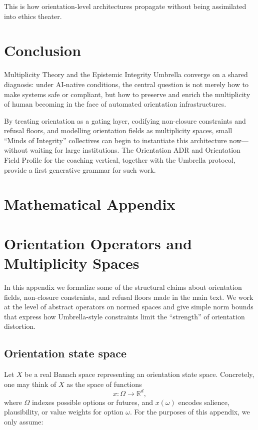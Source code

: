 \documentclass[11pt]{article}
\begin{document}
This is how orientation-level architectures propagate without being assimilated into ethics theater.

\section*{Conclusion}

Multiplicity Theory and the Epistemic Integrity Umbrella converge on a shared diagnosis: under AI-native conditions, the central question is not merely how to make systems safe or compliant, but how to preserve and enrich the multiplicity of human becoming in the face of automated orientation infrastructures.

By treating orientation as a gating layer, codifying non-closure constraints and refusal floors, and modelling orientation fields as multiplicity spaces, small ``Minds of Integrity'' collectives can begin to instantiate this architecture now---without waiting for large institutions. The Orientation ADR and Orientation Field Profile for the coaching vertical, together with the Umbrella protocol, provide a first generative grammar for such work.

\appendix
\section*{Mathematical Appendix}

\section{Orientation Operators and Multiplicity Spaces}

In this appendix we formalize some of the structural claims about orientation fields, non-closure constraints, and refusal floors made in the main text. We work at the level of abstract operators on normed spaces and give simple norm bounds that express how Umbrella-style constraints limit the ``strength'' of orientation distortion.

\subsection{Orientation state space}

Let \(X\) be a real Banach space representing an orientation state space. Concretely, one may think of \(X\) as the space of functions
\[
x : \Omega \to \mathbb{R}^d,
\]
where \(\Omega\) indexes possible options or futures, and \(x(\omega)\) encodes salience, plausibility, or value weights for option \(\omega\). For the purposes of this appendix, we only assume:
\end{document}
